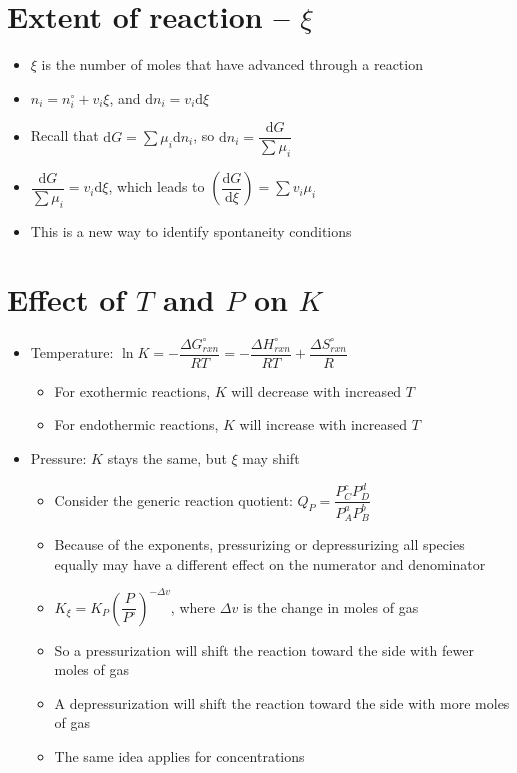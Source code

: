 \documentclass[12pt, openany, letterpaper]{memoir}
\begin{document}
\section*{Extent of reaction -- $\xi$}
\begin{itemize}
	\item $\xi$ is the number of moles that have advanced through a reaction
	\item $n_i = n_i^\circ + v_i\xi$, and $\mathrm{d}n_i = v_i\mathrm{d}\xi$
	\item Recall that $\mathrm{d} G = \sum \mu_i\mathrm{d}n_i$, so $\mathrm{d}n_i=\dfrac{\mathrm{d}G}{\sum \mu_i}$
	\item $\dfrac{\mathrm{d}G}{\sum \mu_i}=v_i\mathrm{d}\xi$, which leads to $\left(\dfrac{\mathrm{d}G}{\mathrm{d}\xi}\right)=\sum v_i\mu_i$
	\item This is a new way to identify spontaneity conditions	
\end{itemize}
\section*{Effect of $T$ and $P$ on $K$}
\begin{itemize}
	\item Temperature: $\ln K = -\dfrac{\Delta G_{rxn}^\circ}{RT} = -\dfrac{\Delta H_{rxn}^\circ}{RT} + \dfrac{\Delta S_{rxn}^\circ}{R}$
	\begin{itemize}
		\item For exothermic reactions, $K$ will decrease with increased $T$
		\item For endothermic reactions, $K$ will increase with increased $T$
	\end{itemize}
	\item Pressure: $K$ stays the same, but $\xi$ may shift
	\begin{itemize}
		\item Consider the generic reaction quotient: $Q_P = \dfrac{P_C^cP_D^d}{P_A^aP_B^b}$
		\item Because of the exponents, pressurizing or depressurizing all species equally may have a different effect on the numerator and denominator
		\item $K_\xi = K_P\left(\dfrac{P}{P^\circ}\right)^{-\Delta v}$, where $\Delta v$ is the change in moles of gas
		\item So a pressurization will shift the reaction toward the side with fewer moles of gas
		\item A depressurization will shift the reaction toward the side with more moles of gas
		\item The same idea applies for concentrations
	\end{itemize}
\end{itemize}
\end{document}
